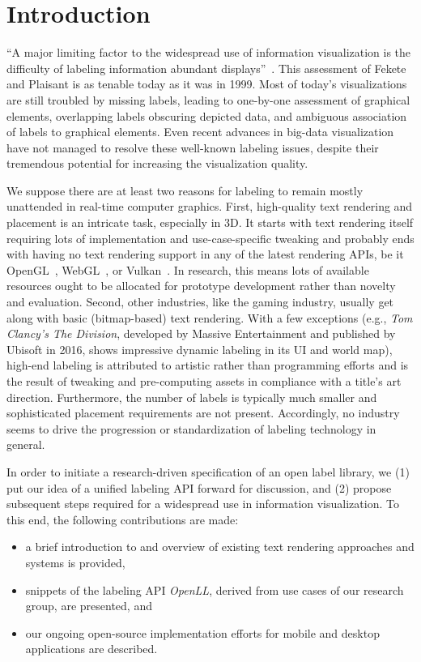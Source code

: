
\section{Introduction}
\label{sec:introduction}
\noindent
\enquote{A major limiting factor to the widespread use of information visualization is the difficulty of labeling information abundant displays}~\cite{Fekete1999}.
This assessment of Fekete and Plaisant is as tenable today as it was in 1999.
Most of today's visualizations are still troubled by missing labels, leading to one-by-one assessment of graphical elements, overlapping labels obscuring depicted data, and ambiguous association of labels to graphical elements.
Even recent advances in big-data visualization have not managed to resolve these well-known labeling issues, despite their tremendous potential for increasing the visualization quality. 

We suppose there are at least two reasons for labeling to remain mostly unattended in real-time computer graphics.
First, high-quality text rendering and placement is an intricate task, especially in 3D. 
It starts with text rendering itself requiring lots of implementation and use-case-specific tweaking and probably ends with having no text rendering support in any of the latest rendering APIs, be it OpenGL~\cite{opengl}, WebGL~\cite{webgl}, or Vulkan~\cite{vulkan}.
In research, this means lots of available resources ought to be allocated for prototype development rather than novelty and evaluation.
Second, other industries, like the gaming industry, usually get along with basic (bitmap-based) text rendering.
With a few exceptions (e.g., \emph{Tom Clancy's The Division}, developed by Massive Entertainment and published by Ubisoft in 2016, shows impressive dynamic labeling in its UI and world map), high-end labeling is attributed to artistic rather than programming efforts and is the result of tweaking and pre-computing assets in compliance with a title's art direction.
Furthermore, the number of labels is typically much smaller and sophisticated placement requirements are not present. 
Accordingly, no industry seems to drive the progression or standardization of labeling technology in general.

In order to initiate a research-driven specification of an open label library, we (1) put our idea of a unified labeling API forward for discussion, and (2) propose subsequent steps required for a widespread use in information visualization.
To this end, the following contributions are made: %
\begin{itemize}
	\item a brief introduction to and overview of existing text rendering approaches and systems is provided,
	\item snippets of the labeling API \emph{OpenLL}, derived from use cases of our research group, are presented, and
	\item our ongoing open-source implementation efforts for mobile and desktop applications are described.
\end{itemize}


